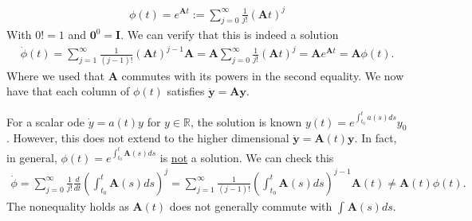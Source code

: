 \begin{itemize}
\begin{enumerate}
\begin{align}
			\phi(t) = e^{\bm{A} t} := \sum_{j=0}^{\infty } \frac{1}{j!} (\bm{A} t)^{j}
		\end{align}
	With $0! =1$ and $\bm{0} ^{0}= \bm{I} $. We can verify that this is indeed a solution
	\begin{align}
		\dot{\phi}(t) = \sum_{j=1}^{\infty } \frac{1}{(j-1)!} (\bm{A} t)^{j-1}\bm{A} = \bm{A} \sum_{j=0}^{\infty } \frac{1}{j!} (\bm{A} t)^{j} = \bm{A}  e^{\bm{A} t} = \bm{A} \phi(t).
	\end{align}
	Where we used that $\bm{A} $ commutes with its powers in the second equality. We now have that each column of $\phi(t)$ satisfies $\dot{\bm{y} } = \bm{A} \bm{y} $.	
	\begin{remark}[]
		For a scalar ode $\dot{y}= a(t)y$ for $y \in \mathbb{R}$, the solution is known $y(t) = e^{\int_{t_0}^{t} a(s)ds}y_0$. However, this does not extend to the higher dimensional $\dot{\bm{y} }= \bm{A} (t)\bm{y} $. In fact, in general, $\phi(t) = e^{\int_{t_0}^{t} \bm{A} (s)ds}$ is \underline{not} a solution. We can check this
	\begin{align}
		\dot{\phi} = \sum_{j=0}^{\infty } \frac{1}{j!} \frac{d}{dt} \left( \int_{t_0}^{t} \bm{A} (s) ds \right)^{j} = \sum_{j=1}^{\infty } \frac{1}{(j-1)!} \left( \int_{t_0}^{t} \bm{A} (s)ds \right)^{j-1} \bm{A} (t) \neq \bm{A} (t) \phi(t).
	\end{align}
	The nonequality holds as $\bm{A} (t)$ does not generally commute with $\int_{}^{} \bm{A} (s)ds$.
	\end{remark}


\end{enumerate}
\end{itemize}
